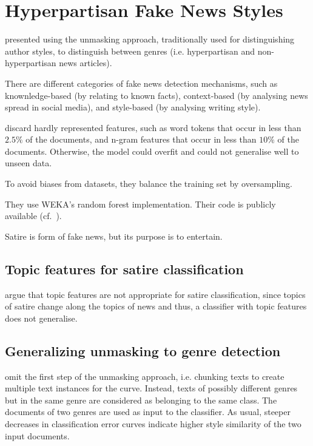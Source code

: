 \section{Hyperpartisan Fake News Styles}
\label{sec:hyperpartisan_fake_news_styles}

\citet{potthast_stylometric_2018} presented using the unmasking approach, traditionally used for distinguishing author styles, 
to distinguish between genres (i.e. hyperpartisan and non-hyperpartisan news articles). 

There are different categories of fake news detection mechanisms, such as knownledge-based (by relating to known facts), 
context-based (by analysing news spread in social media), and style-based (by analysing writing style).

\citet{potthast_stylometric_2018} discard hardly represented features, such as word tokens that occur in less than $2.5 \%$ of the documents, 
and n-gram features that occur in less than $10 \%$ of the documents.
Otherwise, the model could overfit and could not generalise well to unseen data.

To avoid biases from datasets, they balance the training set by oversampling.

They use WEKA's random forest implementation.
Their code is publicly available (cf.~\citep{potthast_stylometric_2018}). 

Satire is form of fake news, but its purpose is to entertain.

\subsection{Topic features for satire classification}
\label{sec:topic_features_for_sarcasm_classification}

\citet{potthast_stylometric_2018} argue that topic features are not appropriate for satire classification, 
since topics of satire change along the topics of news and thus, a classifier with topic features does not generalise.

\subsection{Generalizing unmasking to genre detection}
\label{sec:generalizing_unmasking_to_genre_detection}

\citet{potthast_stylometric_2018} omit the first step of the unmasking approach, i.e. chunking texts to create multiple text instances for the curve.
Instead, texts of possibly different genres but in the same genre are considered as belonging to the same class.
The documents of two genres are used as input to the classifier.
As usual, steeper decreases in classification error curves indicate higher style similarity of the two input documents.